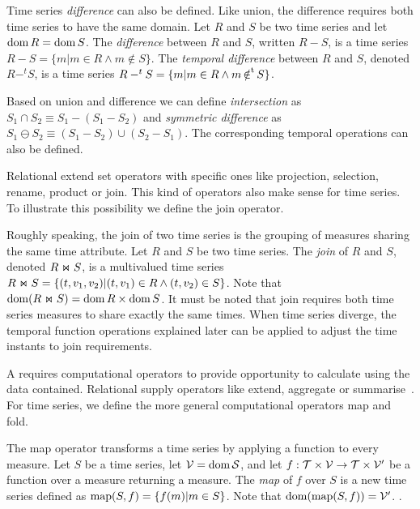 Time series \emph{difference} can also be defined. Like union, the
difference requires both time series to have the same domain.
%
Let $R$ and $S$ be two time series and let $\operatorname{dom} R = \operatorname{dom} S$.
%
The \emph{difference} between $R$ and $S$, written $R-S$, is a time
series $R-S=\{m|m\in R\wedge m\notin S\}$.
%
The \emph{temporal difference} between $R$ and $S$, denoted $R-^t S$, 
is a time series $R-^tS=\{m|m\in R\wedge m \operatorname*{\notin^t} S\}$.


Based on union and difference we can define \emph{intersection} as
$S_1\cap S_2 \equiv S_1 - (S_1 - S_2)$ and \emph{symmetric difference}
as $S_1 \ominus S_2 \equiv (S_1 - S_2) \cup (S_2 - S_1)$. The
corresponding temporal operations can also be defined.

Relational  extend set operators with specific ones like
projection, selection, rename, product or join. This kind of operators
also make sense for time series. To illustrate this possibility we
define the join operator.

Roughly speaking, the join of two time series is the grouping of
measures sharing the same time attribute.  Let $R$ and $S$ be two time
series.  The \emph{join} of $R$ and $S$, denoted $R \Join S$, is a
multivalued time series $R \Join S = \{ (t,v_1,v_2) | (t,v_1) \in
R\wedge (t,v_2) \in S\}$. Note that $\operatorname{dom}(R\Join
S)=\operatorname{dom} R\times\operatorname{dom} S$.
%
It must be noted that join requires both time series measures to share
exactly the same times. When time series diverge, the temporal
function operations explained later can be applied to adjust the time
instants to join requirements.


A  requires computational operators to provide opportunity
to calculate using the data contained. Relational  supply
operators like extend, aggregate or
summarise~\cite{date:introduction}. For time series, we define the more
general computational operators map and fold.

The map operator transforms a time series by applying a function to
every measure.  Let $S$ be a time series, let $\cal{V}=\operatorname{dom} S$, and
let $f:\cal{T}\times\cal{V}\rightarrow\cal{T}\times\cal{V'}$ be a
function over a measure returning a measure. The \emph{map} of $f$
over $S$ is a new time series defined as $\operatorname*{map}(S,f)=\{f(m)|m\in
S\}$. Note that $\operatorname{dom}(\operatorname*{map}(S,f))=\cal{V'}$.
%
.

